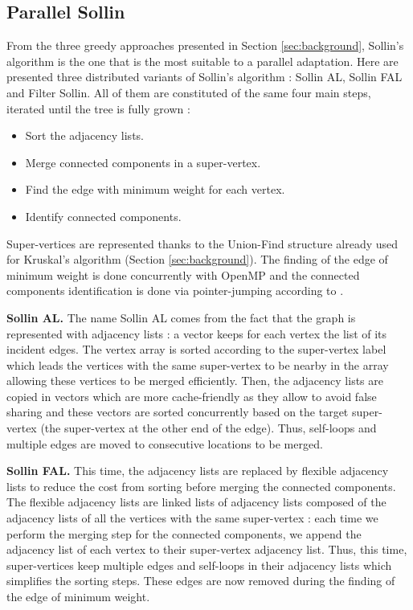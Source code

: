 \documentclass[letterpaper]{article}
\newcommand{\mypar}[1]{{\bf #1.}}
\begin{document}
\subsection{Parallel Sollin} \label{sec:parSollin}

From the three greedy approaches presented in Section \ref{sec:background}, Sollin's algorithm is the one that is the most suitable to a parallel adaptation. Here are presented three distributed variants of Sollin's algorithm : Sollin AL, Sollin FAL and Filter Sollin. All of them are constituted of the same four main steps, iterated until the tree is fully grown :
\begin{itemize}
    \item Sort the adjacency lists.
    \item Merge connected components in a super-vertex.
    \item Find the edge with minimum weight for each vertex.
    \item Identify connected components.
\end{itemize}

Super-vertices are represented thanks to the Union-Find structure already used for Kruskal's algorithm (Section \ref{sec:background}). The finding of the edge of minimum weight is done concurrently with OpenMP and the connected components identification is done via pointer-jumping according to \cite{pointerJump}.

\mypar{Sollin AL} The name Sollin AL comes from the fact that the graph is represented with adjacency lists : a vector keeps for each vertex the list of its incident edges. The vertex array is sorted according to the super-vertex label which leads the vertices with the same super-vertex to be nearby in the array allowing these vertices to be merged efficiently. Then, the adjacency lists are copied in vectors which are more cache-friendly as they allow to avoid false sharing \cite{cache} and these vectors are sorted concurrently based on the target super-vertex (the super-vertex at the other end of the edge).  Thus, self-loops and multiple edges are moved to consecutive locations to be merged.

\mypar{Sollin FAL} This time, the adjacency lists are replaced by flexible adjacency lists to reduce the cost from sorting before merging the connected components. The flexible adjacency lists are linked lists of adjacency lists composed of the adjacency lists of all the vertices with the same super-vertex : each time we perform the merging step for the connected components, we append the adjacency list of each vertex to their super-vertex adjacency list. Thus, this time, super-vertices keep multiple edges and self-loops in their adjacency lists which simplifies the sorting steps. These edges are now removed during the finding of the edge of minimum weight.
\end{document}
